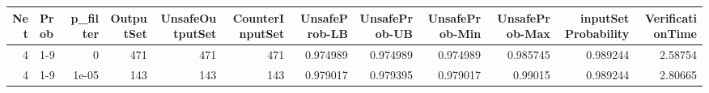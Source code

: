 \begin{tabular}{rlrrrrrrrrrr}
\hline
   Net & Prob   &   p\_filter &   OutputSet &   UnsafeOutputSet &   CounterInputSet &   UnsafeProb-LB &   UnsafeProb-UB &   UnsafeProb-Min &   UnsafeProb-Max &   inputSet Probability &   VerificationTime \\
\hline
     4 & 1-9    &      0     &         471 &               471 &               471 &        0.974989 &        0.974989 &         0.974989 &         0.985745 &               0.989244 &            2.58754 \\
     4 & 1-9    &      1e-05 &         143 &               143 &               143 &        0.979017 &        0.979395 &         0.979017 &         0.99015  &               0.989244 &            2.80665 \\
\hline
\end{tabular}
